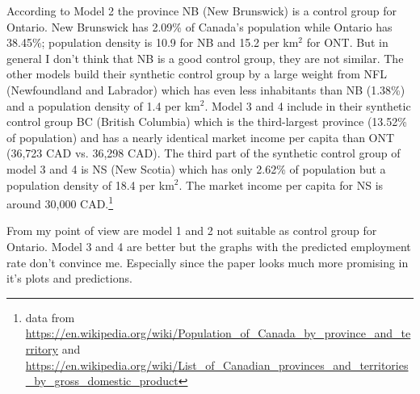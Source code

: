 \documentclass{article}
\begin{document}
	According to Model 2 the province NB (New Brunswick) is a control group for Ontario. New Brunswick has 2.09\% of Canada's population while Ontario has 38.45\%; population density is 10.9 for NB and 15.2 per km$^2$ for ONT. But in general I don't think that NB is a good control group, they are not similar. The other models build their synthetic control group by a large weight from NFL (Newfoundland and Labrador) which has even less inhabitants than NB (1.38\%) and a population density of 1.4 per km$^2$. Model 3 and 4 include in their synthetic control group BC (British Columbia) which is the third-largest province (13.52\% of population) and has a nearly identical market income per capita than ONT (36,723 CAD vs. 36,298 CAD). The third part of the synthetic control group of model 3 and 4 is NS (New Scotia) which has only 2.62\% of population but a population density of 18.4 per km$^2$. The market income per capita for NS is around 30,000 CAD.\footnote{data from \url{https://en.wikipedia.org/wiki/Population_of_Canada_by_province_and_territory} and \url{https://en.wikipedia.org/wiki/List_of_Canadian_provinces_and_territories_by_gross_domestic_product}}
	
	From my point of view are model 1 and 2 not suitable as control group for Ontario. Model 3 and 4 are better but the graphs with the predicted employment rate don't convince me. Especially since the paper \cite{Abadie2015} looks much more promising in it's plots and predictions.
	
	\printbibliography 
\end{document}
